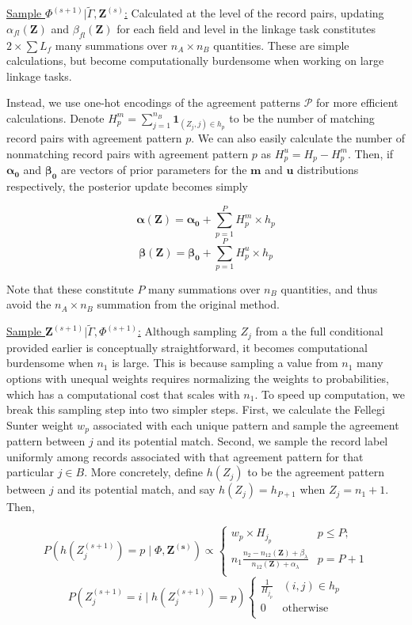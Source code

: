 \documentclass[12pt,letterpaper]{article}
\newcommand{\1}[1]{\mathbb{I}\!\left[#1\right]} %
\begin{document}
\underline{Sample $\Phi^{(s+1)}|\tilde{\Gamma}, \bm{Z}^{(s)}$:} Calculated at the level of the record pairs, updating  \(\alpha_{fl}(\bm{Z})\) and \(\beta_{fl}(\bm{Z})\) for each field and level in the linkage task constitutes \(2 \times \sum L_f\) many summations over \(n_A \times n_B\) quantities. These are simple calculations, but become computationally burdensome when working on large linkage tasks. 

Instead, we use one-hot encodings of the agreement patterns $\mathcal{P}$ for more efficient calculations. Denote
$H_p^m = \sum_{j=1}^{n_B} \bm{1}_{(Z_j, j) \in h_p}$ to be the
number of matching record pairs with agreement pattern $p$. We can also easily calculate the number of nonmatching record pairs with agreement pattern $p$ as \(H_p^u = H_p - H_p^m\). Then, if $\bm{\alpha_0}$ and $\bm{\beta_0}$ are vectors of prior parameters for the $\bm{m}$ and $\bm{u}$ distributions respectively, the posterior update becomes simply

$$\bm{\alpha(Z)} = \bm{\alpha_0} + \sum_{p=1}^P H_p^m \times h_p$$
$$\bm{\beta(Z)} = \bm{\beta_0} + \sum_{p=1}^P H_p^u \times h_p$$

Note that these constitute \(P\) many summations over \(n_B\) quantities, and thus avoid the \(n_A \times n_B\) summation from the original method.

\underline{Sample $\bm{Z}^{(s+1)}|\tilde{\Gamma}, \Phi^{(s+1)}$:} Although sampling \(Z_j\) from a the
full conditional provided earlier is conceptually straightforward, it
becomes computational burdensome when $n_1$ is large. This is because sampling a value from $n_1$ many options with unequal weights requires normalizing the weights to probabilities, which has a computational cost that scales with $n_1$. To speed up
computation, we break this sampling step into two simpler steps. First,
we calculate the Fellegi Sunter weight \(w_{p}\) associated with each
unique pattern and sample the agreement pattern between \(j\) and its
potential match. Second, we sample the record label uniformly among
records associated with that agreement pattern for that particular
\(j\in B\). More concretely, define \(h(Z_j)\) to be the agreement
pattern between \(j\) and its potential match, and say
\(h(Z_j) = h_{P+1}\) when \(Z_j = n_1 + 1\). Then,

$$P\left(h\left(Z_j^{(s+1)}\right) = p \mid \Phi, \bm{Z^{(s)}}\right) \propto
\begin{cases} 
	w_{p}\times H_{j_p}  & p \leq P; \\
	n_1 \frac{n_2 - n_{12}(\bm{Z}) + \beta_{\lambda}}{n_{12}(\bm{Z}) + \alpha_{\lambda}} &   p = P + 1 \\
\end{cases}$$
$$P\left(Z_j^{(s+1)} = i \mid h\left(Z_j^{(s+1)}\right) = p\right) \begin{cases} 
	\frac{1}{H_{j_p}} & (i, j) \in h_p \\
	0 & \text{otherwise} \\
\end{cases}$$
\end{document}
